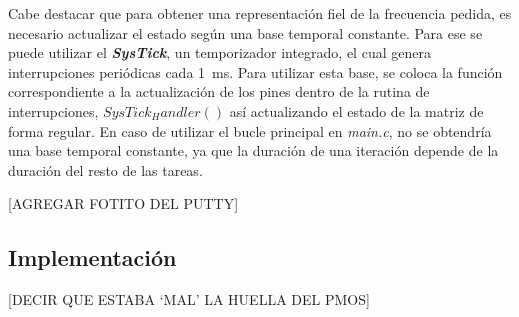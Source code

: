 Cabe destacar que para obtener una representación fiel de la frecuencia pedida, es necesario actualizar el estado según una base temporal constante. Para ese se puede utilizar el \textit{\textbf{SysTick}}, un temporizador integrado, el cual genera interrupciones periódicas cada \SI{1}{\milli \second}. Para utilizar esta base, se coloca la función correspondiente a la actualización de los pines dentro de la rutina de interrupciones, \textbf{$SysTick_Handler()$} así actualizando el estado de la matriz de forma regular. En caso de utilizar el bucle principal en \textit{main.c}, no se obtendría una base temporal constante, ya que la duración de una iteración depende de la duración del resto de las tareas.


[AGREGAR FOTITO DEL PUTTY]




\subsection{Implementación}

[DECIR QUE ESTABA \enquote*{MAL} LA HUELLA DEL PMOS]
